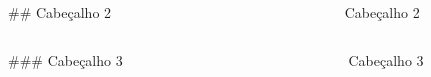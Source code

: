\documentclass[
]{book}
\begin{document}
\begin{columns}

\begin{column}

\#\# Cabeçalho 2

\end{column}

\begin{column}

~

\end{column}

\begin{column}

\hypertarget{cabeuxe7alho-2}{}
\begin{section}

Cabeçalho 2

\end{section}

\end{column}

\end{columns}

\begin{columns}

\begin{column}

\#\#\# Cabeçalho 3

\end{column}

\begin{column}

~

\end{column}

\begin{column}

\hypertarget{cabeuxe7alho-3}{}
\begin{section}

Cabeçalho 3

\end{section}

\end{column}

\end{columns}
\end{document}
